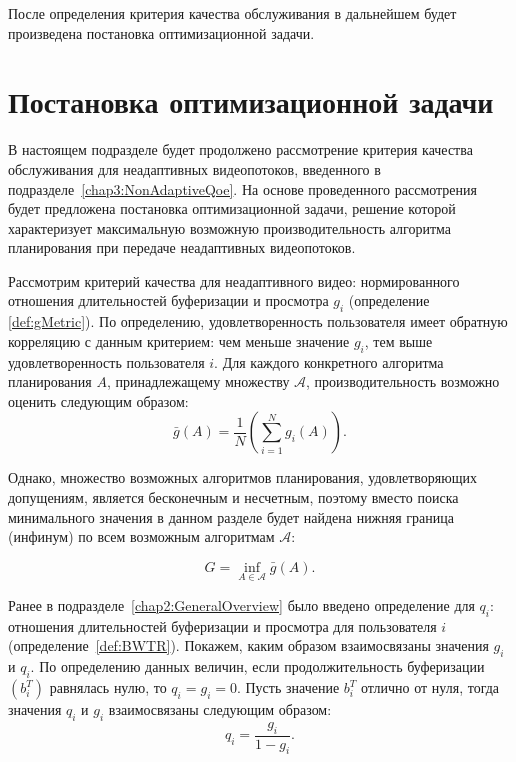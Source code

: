 После определения критерия качества обслуживания в дальнейшем будет произведена постановка оптимизационной задачи.

\section{Постановка оптимизационной задачи}
\label{chap3:NonAdaptiveOptimizationProblem}

В настоящем подразделе будет продолжено рассмотрение критерия качества обслуживания для неадаптивных видеопотоков, введенного в подразделе~\ref{chap3:NonAdaptiveQoe}. На основе проведенного рассмотрения будет предложена постановка оптимизационной задачи, решение которой характеризует максимальную возможную производительность алгоритма планирования при передаче неадаптивных видеопотоков.

Рассмотрим критерий качества для неадаптивного видео: нормированного отношения длительностей буферизации и просмотра $g_i$ (определение \ref{def:gMetric}). По определению, удовлетворенность пользователя имеет обратную корреляцию с данным критерием: чем меньше значение $g_i$, тем выше удовлетворенность пользователя $i$. Для каждого конкретного алгоритма планирования $A$, принадлежащему множеству $\mathcal{A}$, производительность возможно оценить следующим образом:
$$\bar{g}\left(A\right) = \frac{1}{N}\left(\sum\limits_{i=1}^{N} {g_i\left(A\right)}\right).$$

Однако, множество возможных алгоритмов планирования, удовлетворяющих допущениям, является бесконечным и несчетным, поэтому вместо поиска минимального значения в данном разделе будет найдена нижняя граница (инфинум) по всем возможным алгоритмам $\mathcal{A}$:

\begin{equation}
	\label{eq:gMetricGoal}
	G = \inf\limits_{A \in \mathcal{A}} \bar{g}\left(A\right).
\end{equation}

Ранее в подразделе~\ref{chap2:GeneralOverview} было введено определение для $q_i$: отношения длительностей буферизации и просмотра для пользователя $i$ (определение~\ref{def:BWTR}). Покажем, каким образом взаимосвязаны значения $g_i$ и $q_i$. По определению данных величин, если продолжительность буферизации $\left(b_i^T\right)$ равнялась нулю, то $q_i=g_i=0$. Пусть значение $b_i^T$ отлично от нуля, тогда значения $q_i$ и $g_i$ взаимосвязаны следующим образом:
$$q_i = \frac{g_i}{1-g_i}.$$

